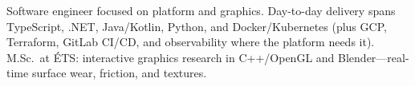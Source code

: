 

\begin{cvparagraph}

Software engineer focused on platform and graphics. Day-to-day delivery spans TypeScript, .NET, Java/Kotlin, Python, and Docker/Kubernetes (plus GCP, Terraform, GitLab CI/CD, and \mbox{observability} where the platform needs it). M.Sc.\ at ÉTS: interactive graphics research in C++/OpenGL and Blender---real-time surface wear, friction, and textures.
\end{cvparagraph}
